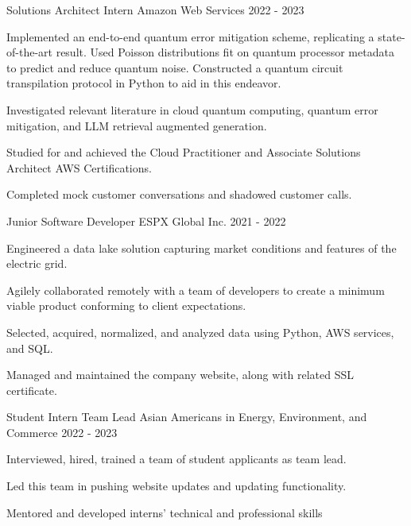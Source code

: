 
\begin{cventries}
\cventry
{Solutions Architect Intern}
{Amazon Web Services}
{2022 - 2023}
{}{{\begin{cvitems}
\item Implemented an end-to-end quantum error mitigation scheme, replicating a state-of-the-art result. Used Poisson distributions fit on quantum processor metadata to predict and reduce quantum noise. Constructed a quantum circuit transpilation protocol in Python to aid in this endeavor.
\item Investigated relevant literature in cloud quantum computing, quantum error mitigation, and LLM retrieval augmented generation.
\item Studied for and achieved the Cloud Practitioner and Associate Solutions Architect AWS Certifications.
\item Completed mock customer conversations and shadowed customer calls.
\end{cvitems}
}}

\cventry
{Junior Software Developer}
{ESPX Global Inc.}
{2021 - 2022}
{}{{\begin{cvitems}
\item Engineered a data lake solution capturing market conditions and features of the electric grid.
\item Agilely collaborated remotely with a team of developers to create a minimum viable product conforming to client expectations.
\item Selected, acquired, normalized, and analyzed data using Python, AWS services, and SQL.
\item Managed and maintained the company website, along with related SSL certificate.
\end{cvitems}
}}

\cventry
{Student Intern Team Lead}
{Asian Americans in Energy, Environment, and Commerce}
{2022 - 2023}
{}{{\begin{cvitems}
\item Interviewed, hired, trained a team of student applicants as team lead.
\item Led this team in pushing website updates and updating functionality.
\item Mentored and developed interns' technical and professional skills
\end{cvitems}
}}


\end{cventries}
